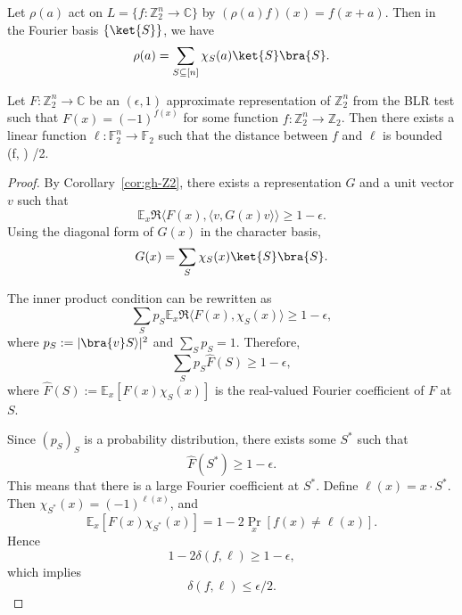 \begin{fact}
    Let $\rho(a)$ act on $L=\{f:\mathbb{Z}_2^n\to\mathbb{C}\}$ by $(\rho(a)f)(x)=f(x+a)$. 
    Then in the Fourier basis $\{\ket{S}\}$, we have
    \[
    \rho(a) = \sum_{S\subseteq[n]} \chi_S(a)\ket{S}\bra{S}.
    \]
\end{fact}

\begin{lemma}\label{lem:gh-linearity}
    Let $F: \mathbb{Z}_2^n \to \mathbb{C}$ be an $(\epsilon, 1)$ approximate representation of $\mathbb{Z}_2^n$ from the BLR test 
    such that $F(x) = (-1)^{f(x)}$ for some function $f: \mathbb{Z}_2^n \to \mathbb{Z}_2$.
    Then there exists a linear function $\ell: \mathbb{F}_2^n \to \mathbb{F}_2$ such that the distance between $f$ and $\ell$ is bounded
    \be
    \delta(f, \ell) \leq \epsilon/2.
    \ee
\end{lemma}


\begin{proof}
    By Corollary~\ref{cor:gh-Z2}, there exists a representation $G$ and a unit vector $v$ such that
    \[
        \mathbb{E}_{x} \Re \langle F(x), \langle v, G(x)v\rangle \rangle \ge 1 - \epsilon.
    \]
    Using the diagonal form of $G(x)$ in the character basis,
    \[
        G(x) = \sum_S \chi_S(x) \ket{S}\bra{S}.
    \]

    The inner product condition can be rewritten as
    \[
       \sum_{S} p_S  \mathbb{E}_{x} \Re \langle F(x), \chi_S(x) \rangle \ge 1 - \epsilon,
    \]
        where $p_S := |\bra{v}S\rangle|^2$ and $\sum_S p_S = 1$.
    Therefore,
    \[
        \sum_S p_S \widehat{F}(S) \ge 1 - \epsilon,
    \]
    where $\widehat{F}(S):=\mathbb{E}_x[F(x)\chi_S(x)]$ is the real-valued Fourier coefficient of $F$ at $S$.

    Since $(p_S)_S$ is a probability distribution, there exists some $S^*$ such that
    \[
        \widehat{F}(S^*) \ge 1 - \epsilon.
    \]
    This means that there is a large Fourier coefficient at $S^*$.
    Define $\ell(x)=x\cdot S^*$. Then $\chi_{S^*}(x)=(-1)^{\ell(x)}$, and
    \[
        \mathbb{E}_x[F(x)\chi_{S^*}(x)] = 1 - 2\Pr_x[f(x)\neq \ell(x)].
    \]
    Hence
    \[
        1 - 2\delta(f,\ell) \ge 1 - \epsilon,
    \]
    which implies
    \[
        \delta(f,\ell) \le \epsilon/2.
    \]
\end{proof}

